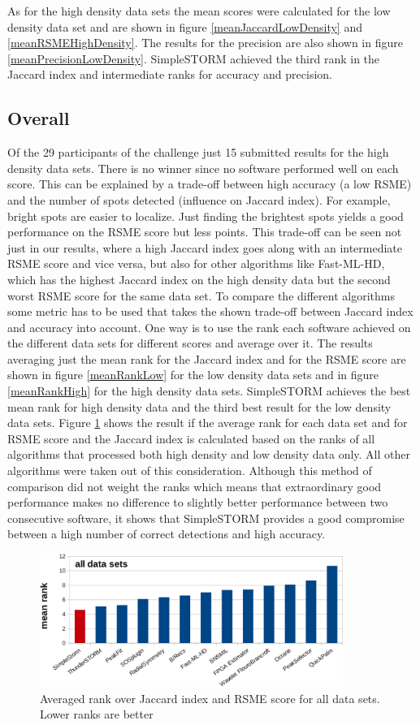 As for the high density data sets the mean scores were calculated for the low density data set and are shown in figure \ref{meanJaccardLowDensity} and \ref{meanRSMEHighDensity}. The results for the precision are also shown in figure \ref{meanPrecisionLowDensity}. SimpleSTORM achieved the third rank in the Jaccard index and intermediate ranks for accuracy and precision.



\subsection{Overall}
Of the 29 participants of the challenge just 15 submitted results for the high density data sets. There is no winner since no software performed well on each score. This can be explained by a trade-off between high accuracy (a low RSME) and the number of spots detected (influence on Jaccard index). For example, bright spots are easier to localize. Just finding the brightest spots yields a good performance on the RSME score but less points. This trade-off can be seen not just in our results, where a high Jaccard index goes along with an intermediate RSME score and vice versa, but also for other algorithms like Fast-ML-HD, which has the highest Jaccard index on the high density data but the second worst RSME score for the same data set.\newline
To compare the different algorithms some metric has to be used that takes the shown trade-off between Jaccard index and accuracy into account. One way is to use the rank each software achieved on the different data sets for different scores and average over it. The results averaging just the mean rank for the Jaccard index and for the RSME score are shown in figure \ref{meanRankLow} for the low density data sets and in figure \ref{meanRankHigh} for the high density data sets.\newline
SimpleSTORM achieves the best mean rank for high density data and the third best result for the low density data sets. \newline
Figure \ref{meanRankOverall} shows the result if the average rank for each data set and for RSME score and the Jaccard index is calculated based on the ranks of all algorithms that processed both high density and low density data only. All other algorithms were taken out of this consideration. Although this method of comparison did not weight the ranks which means that extraordinary good performance makes no difference to slightly better performance between two consecutive software, it shows that SimpleSTORM provides a good compromise between a high number of correct detections and high accuracy.



\begin{figure}
\centering
\includegraphics[width = 0.88\textwidth]{pictures/diagrammsChallenge/MeanRankOverallCropped.pdf}
	\caption{Averaged rank over Jaccard index and RSME score for all data sets. Lower ranks are better}
	\label{meanRankOverall}
\end{figure}